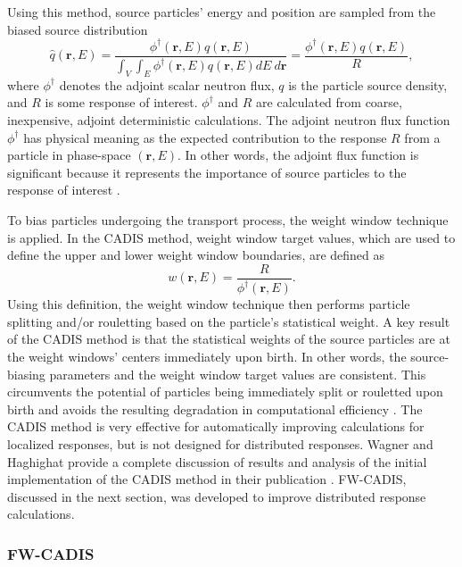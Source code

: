 \documentclass{article} %
\newcommand{\vecr}{\textbf{r}}
\newcommand{\qhat}{\ensuremath{\hat{q}}}
\newcommand{\fwc}{\mbox{FW-CADIS}}
\begin{document}
Using this method, source particles' energy and position are sampled from the
biased source distribution
%
\begin{equation}
\qhat(\vecr,E) = 
\frac{\phi^{\dagger}(\vecr,E)q(\vecr,E)}
{\int_V\int_E\phi^{\dagger}(\vecr,E)q(\vecr,E) dE\ d\vecr} 
= \frac{\phi^{\dagger}(\vecr,E)q(\vecr,E)}{R},
\label{eq:cadis_sb}
\end{equation}
%
where $\phi^{\dagger}$ denotes the adjoint scalar neutron flux, $q$ is the
particle source density, and $R$ is some response of interest.
$\phi^{\dagger}$ and $R$ are calculated from coarse, inexpensive, adjoint
deterministic calculations. The adjoint neutron flux function $\phi^{\dagger}$
has physical meaning as the expected contribution to the response $R$ from a
particle in phase-space $(\vecr,E)$. In other words, the adjoint flux
function is significant because it represents the importance of source
particles to the response of interest \cite{bg}.

To bias particles undergoing the transport process, the weight window
technique is applied. In the CADIS method, weight window target values, which
are used to define the upper and lower weight window boundaries, are defined
as
%
\begin{equation}
w(\vecr,E) 
= \frac{R}{\phi^{\dagger}(\vecr,E)}.
\label{eq:cadis_tb}
\end{equation}
%
Using this definition, the weight window technique then performs particle
splitting and/or rouletting based on the particle's statistical weight. A key
result of the CADIS method is that the statistical weights of the source
particles are at the weight windows' centers immediately upon birth. In other
words, the source-biasing parameters and the weight window target values are
consistent. This circumvents the potential of particles being immediately
split or rouletted upon birth and avoids the resulting degradation in
computational efficiency \cite{cadis}. The CADIS method is very effective for
automatically improving calculations for localized responses, but is not
designed for distributed responses. Wagner and Haghighat provide a complete
discussion of results and analysis of the initial implementation of the CADIS
method in their publication \cite{cadis}. \fwc, discussed in the next section,
was developed to improve distributed response calculations.

\subsubsection{\fwc}
\end{document}
